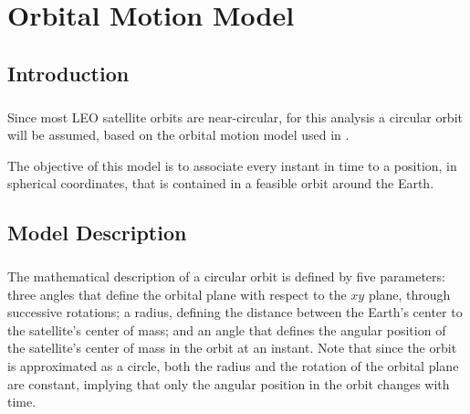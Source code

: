 %
%
%
%
%
%
%
%
%
%

\chapter{Orbital Motion Model} \label{ch:orbital-motion-model}

\section{Introduction}

\paragraph{}
\indent 
Since most LEO satellite orbits are near-circular, for this analysis a circular orbit will be assumed, based on the orbital motion model used in \cite{Edemar}.

\indent
The objective of this model is to associate every instant in time to a position, in spherical coordinates, that is contained in a feasible orbit around the Earth.

\section{Model Description}

\paragraph{}
\indent

The mathematical description of a circular orbit is defined by five parameters: three angles that define the orbital plane with respect to the $xy$ plane, through successive rotations; a radius, defining the distance between the Earth's center to the satellite's center of mass; and an angle that defines the angular position of the satellite's center of mass in the orbit at an instant. Note that since the orbit is approximated as a circle, both the radius and the rotation of the orbital plane are constant, implying that only the angular position in the orbit changes with time. 

